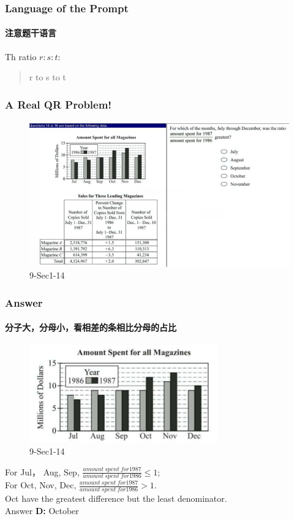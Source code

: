 \documentclass[
	11pt, %
]{beamer}
\begin{document}

\begin{frame}
	\frametitle{Language of the Prompt}
	\framesubtitle{注意题干语言}
	{\LARGE Th ratio $r:s:t$:} 
	\begin{quote}
	{\LARGE r to s to t}
	\end{quote}
\end{frame}


\begin{frame}
	\frametitle{A Real QR Problem!}
	\framesubtitle{}
	\begin{figure}
		\includegraphics[width=\linewidth]{Ratio_Example_Question1.png}
		\caption{9-Sec1-14}
	\end{figure}

\end{frame}


\begin{frame}
	\frametitle{Answer}
	\framesubtitle{分子大，分母小，看相差的条相比分母的占比}

	\begin{figure}
		\includegraphics[width=0.5\linewidth]{Ratio_Example_Question1_1.png}
		\caption{9-Sec1-14}
	\end{figure}

For Jul， Aug, Sep, $\frac{amount \ spent \ for 1987}{amount \ spent \ for 1986} \leq 1$; \\
For Oct, Nov, Dec, $\frac{amount \ spent \ for 1987}{amount \ spent \ for 1986} > 1$. \\
Oct have the greatest difference but the least denominator. \\


	

\bigskip
Answer \textbf{D: } October\\
\end{frame}
\end{document}
